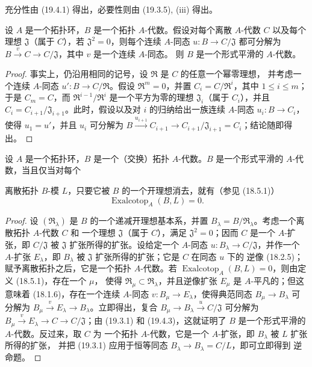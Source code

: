 充分性由 (19.4.1) 得出，必要性则由 (19.3.5), (iii) 得出。

\begin{proposition}[19.4.3]
\label{0.19.4.3-fr}
设 $A$ 是一个拓扑环，$B$ 是一个拓扑 $A$-代数。假设对每个离散
$A$-代数 $C$ 以及每个理想 $\mathfrak J$（属于 $C$），若
$\mathfrak J^2=0$，则每个连续 $A$-同态 $u:B\to C/\mathfrak J$ 都可分解为
$B\xrightarrow{v}C\to C/\mathfrak J$，其中 $v$ 是一个连续 $A$-同态。
则 $B$ 是一个形式平滑的 $A$-代数。
\end{proposition}

\begin{proof}
事实上，仍沿用相同的记号，设 $\mathfrak R$ 是 $C$ 的任意一个幂零理想，
并考虑一个连续 $A$-同态 $u':B\to C/\mathfrak R$。假设
$\mathfrak R^m=0$，并置 $C_i=C/\mathfrak R^i$，其中
$1\leq i\leq m$；于是 $C_m=C$，而
$\mathfrak R^{i-1}/\mathfrak R^i$ 是一个平方为零的理想
$\mathfrak J_i$（属于 $C_i$），并且 $C_i=C_{i+1}/\mathfrak J_{i+1}$。此时，假设以及对
$i$ 的归纳给出一族连续 $A$-同态 $u_i:B\to C_i$，使得
$u_1=u'$，并且 $u_i$ 可分解为
$B\xrightarrow{u_{i+1}}C_{i+1}\to
C_{i+1}/\mathfrak J_{i+1}=C_i$；结论随即得出。
\end{proof}

\begin{proposition}[19.4.4]
\label{0.19.4.4-fr}
设 $A$ 是一个拓扑环，$B$ 是一个（交换）拓扑 $A$-代数。$B$ 是一个形式平滑的
$A$-代数，当且仅当对每个


离散拓扑 $B$-模 $L$，只要它被 $B$ 的一个开理想消去，就有（参见 (18.5.1)）
\[
  \operatorname{Exalcotop}_A(B,L)=0.
\]
\end{proposition}

\begin{proof}
设 $(\mathfrak R_\lambda)$ 是 $B$ 的一个递减开理想基本系，并置
$B_\lambda=B/\mathfrak R_\lambda$。考虑一个离散拓扑 $A$-代数 $C$ 和
一个理想 $\mathfrak J$（属于 $C$），满足 $\mathfrak J^2=0$；因而 $C$ 是一个
$A$-扩张，即 $C/\mathfrak J$ 被 $\mathfrak J$ 扩张所得的扩张。设给定一个
$A$-同态 $u:B_\lambda\to C/\mathfrak J$，并作一个 $A$-扩张
$E_\lambda$，即 $B_\lambda$ 被 $\mathfrak J$ 扩张所得的扩张；它是 $C$ 在同态 $u$ 下的
逆像 (18.2.5)；赋予离散拓扑之后，它是一个拓扑 $A$-代数。若
$\operatorname{Exalcotop}_A(B,L)=0$，则由定义 (18.5.1)，存在一个 $\mu$，
使得 $\mathfrak R_\mu\subset\mathfrak R_\lambda$，并且逆像扩张
$E_\mu$ 是 $A$-平凡的；但这意味着 (18.1.6)，存在一个连续 $A$-同态
$v:B_\mu\to E_\lambda$，使得典范同态 $B_\mu\to B_\lambda$ 可分解为
$B_\mu\xrightarrow{v}E_\lambda\to B_\lambda$。立即得出，复合
$B_\mu\to B_\lambda\xrightarrow{u}C/\mathfrak J$ 可分解为
$B_\mu\xrightarrow{v}E_\lambda\to C\to C/\mathfrak J$；由 (19.3.1) 和
(19.4.3)，这就证明了 $B$ 是一个形式平滑的 $A$-代数。反过来，取 $C$ 为
一个拓扑 $A$-代数，它是一个 $A$-扩张，即 $B_\lambda$ 被 $L$ 扩张所得的扩张，
并把 (19.3.1) 应用于恒等同态 $B_\lambda\to B_\lambda=C/L$，即可立即得到
逆命题。
\end{proof}

